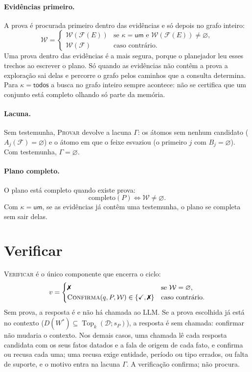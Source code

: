 \documentclass[11pt]{article}
\theoremstyle{definition}
\theoremstyle{plain}
\newcommand{\op}[1]{\textsc{#1}}
\newcommand{\D}{\mathcal{D}}          %
\newcommand{\F}{\mathcal{F}}          %
\newcommand{\W}{\mathcal{W}}          %
\newcommand{\Top}{\operatorname{Top}}
\newcommand{\um}{\textsf{um}}
\newcommand{\todos}{\textsf{todos}}
\newcommand{\ok}{\checkmark}
\begin{document}
\paragraph{Evidências primeiro.} A prova é procurada primeiro dentro das
evidências e só depois no grafo inteiro:
\begin{equation}
\label{eq:provar}
\W=
\begin{cases}
\W(\F(E)) & \text{se } \kappa=\um \text{ e } \W(\F(E))\neq\varnothing,\\
\W(\F) & \text{caso contrário.}
\end{cases}
\end{equation}
Uma prova dentro das evidências é a mais segura, porque o planejador leu esses
trechos ao escrever o plano. Só quando as evidências não contêm a prova a
exploração sai delas e percorre o grafo pelos caminhos que a consulta
determina. Para $\kappa=\todos$ a busca no grafo inteiro sempre acontece: não
se certifica que um conjunto está completo olhando só parte da memória.

\paragraph{Lacuna.} Sem testemunha, \op{Provar} devolve a lacuna $\Gamma$: os
átomos sem nenhum candidato ($A_j(\F)=\varnothing$) e o átomo em que o feixe
esvaziou (o primeiro $j$ com $B_j=\varnothing$). Com testemunha,
$\Gamma=\varnothing$.

\paragraph{Plano completo.} O plano está completo quando existe prova:
\begin{equation}
\label{eq:parada}
\mathrm{completo}(P)\iff\W\neq\varnothing.
\end{equation}
Com $\kappa=\um$, se as evidências já contêm uma testemunha, o plano se
completa sem sair delas.

\section{Verificar}
\label{sec:verificar}

\op{Verificar} é o único componente que encerra o ciclo:
\begin{equation}
\label{eq:verificar}
v=
\begin{cases}
\text{\ding{55}} & \text{se } \W=\varnothing,\\
\op{Confirma}(q,P,\W)\in\{\ok,\text{\ding{55}}\} & \text{caso contrário.}
\end{cases}
\end{equation}
Sem prova, a resposta é  e não há chamada ao LLM. Se a prova
escolhida já está no contexto ($D(W^\ast)\subseteq\Top_k(\D;s_P)$), a
resposta é \ok{} sem chamada: confirmar não mudaria o contexto. Nos demais
casos, uma chamada lê cada resposta candidata com os seus fatos datados e a
fala de origem de cada fato, e confirma ou recusa cada uma; uma recusa exige
entidade, período ou tipo errados, ou falta de suporte, e o motivo entra na
lacuna $\Gamma$. A verificação confirma; não procura.
\end{document}
